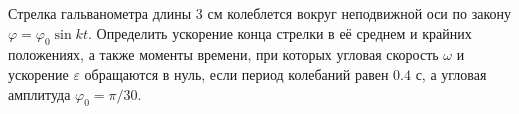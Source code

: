 Стрелка гальванометра длины $3$ см колеблется вокруг неподвижной оси по закону
$\varphi = \varphi _0 \sin{kt}$.
Определить ускорение конца стрелки в её среднем и крайних положениях,
а также моменты времени, при которых угловая скорость $\omega$ и ускорение
$\varepsilon$ обращаются в нуль, если период колебаний равен $0.4$ с,
а угловая амплитуда $\varphi _0 = \pi/30$.
